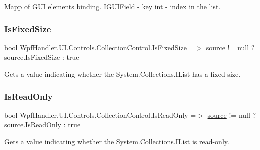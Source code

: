 Mapp of G\+UI elements binding. I\+G\+U\+I\+Field -\/ key int -\/ index in the list. 

\mbox{\label{class_wpf_handler_1_1_u_i_1_1_controls_1_1_collection_control_aa95fcae30ed2356bfff8154bcceecc8a}} 
\subsubsection{\texorpdfstring{Is\+Fixed\+Size}{IsFixedSize}}
{\footnotesize\ttfamily bool Wpf\+Handler.\+U\+I.\+Controls.\+Collection\+Control.\+Is\+Fixed\+Size =$>$ \mbox{\hyperlink{class_wpf_handler_1_1_u_i_1_1_controls_1_1_collection_control_a78ccfdc5208ab2306308d7356757f32f}{source}} != null ? source.\+Is\+Fixed\+Size \+: true}



Gets a value indicating whether the System.\+Collections.\+I\+List has a fixed size. 

\mbox{\label{class_wpf_handler_1_1_u_i_1_1_controls_1_1_collection_control_a2e1f163821f2cbc367ef40d3dcf652eb}} 
\subsubsection{\texorpdfstring{Is\+Read\+Only}{IsReadOnly}}
{\footnotesize\ttfamily bool Wpf\+Handler.\+U\+I.\+Controls.\+Collection\+Control.\+Is\+Read\+Only =$>$ \mbox{\hyperlink{class_wpf_handler_1_1_u_i_1_1_controls_1_1_collection_control_a78ccfdc5208ab2306308d7356757f32f}{source}} != null ? source.\+Is\+Read\+Only \+: true}



Gets a value indicating whether the System.\+Collections.\+I\+List is read-\/only. 

